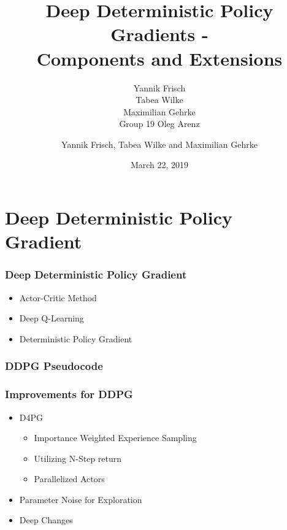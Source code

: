 \documentclass[accentcolor=tud1d,colorbacktitle,inverttitle,landscape,german,presentation,t]{tudbeamer}
\begin{document}
	
	\title[DDPG]{Deep Deterministic Policy Gradients -\\ Components and Extensions}
	\subtitle{Yannik Frisch\\Tabea Wilke\\Maximilian Gehrke \\Group 19 Oleg Arenz}
	
	\author[Yannik Frisch et al.]{Yannik Frisch, Tabea Wilke and Maximilian Gehrke}
	
	
	\date{March 22, 2019}
	

\begin{titleframe}
\end{titleframe}
\section{Deep Deterministic Policy Gradient}
	\begin{frame}
		\frametitle{Deep Deterministic Policy Gradient}
		\begin{itemize}
			\item Actor-Critic Method
			\item Deep Q-Learning
			\item Deterministic Policy Gradient
		\end{itemize}
	\end{frame}
	\begin{frame}
		\frametitle{DDPG Pseudocode}
	\end{frame}
	\begin{frame}
		\frametitle{Improvements for DDPG}
		\begin{itemize}
			\item D4PG
			\begin{itemize}
				\item Importance Weighted Experience Sampling
				\item Utilizing N-Step return
				\item Parallelized Actors
			\end{itemize}
			\item Parameter Noise for Exploration
			\item Deep Changes
		\end{itemize}
	\end{frame}
\end{document}
